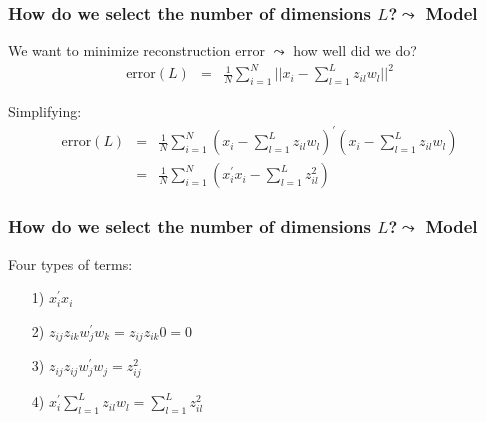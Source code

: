 \begin{frame}[fragile]
\frametitle{How do we select the number of dimensions $L$?$\leadsto$ \alert{Model}}

We want to minimize reconstruction error  $\leadsto$ how well did we do?  \\

\begin{eqnarray}
\text{error}(L) & = & \frac{1}{N} \sum_{i=1}^{N} ||{x}_{i} - \sum_{l = 1}^{L} z_{il} {w}_{l} ||^{2}   \nonumber 
\end{eqnarray}

Simplifying:  
\begin{eqnarray}
\text{error}(L)  & = & \frac{1}{N} \sum_{i=1}^{N} ({x}_{i} - \sum_{l = 1}^{L} z_{il}{w}_l)^{'} ({x}_{i} - \sum_{l = 1}^{L} z_{il}{w}_l ) \nonumber \\
& = & \frac{1}{N} \sum_{i=1}^{N} \left({x}_{i}^{'}{x}_{i} - \sum_{l=1}^{L} z_{il}^{2} \right)\nonumber
\end{eqnarray}

\end{frame}

\begin{frame}[fragile]
\frametitle{How do we select the number of dimensions $L$?$\leadsto$ \alert{Model}}

Four types of terms:  
\begin{itemize}
\item[1)] ${x}_{i}^{'}{x}_{i} $
\item[2)] $z_{ij}z_{ik} {w}_{j}^{'}{w}_{k} = z_{ij}z_{ik} 0  = 0 $  
\item[3)] $z_{ij}z_{ij} {w}_{j}^{'}{w}_{j} = z_{ij}^2$ 
\item[4)] ${x}_{i}^{'}\sum_{l=1}^{L} z_{il} {w}_{l} = \sum_{l=1}^{L} z_{il}^{2} $
\end{itemize}
\end{frame}


